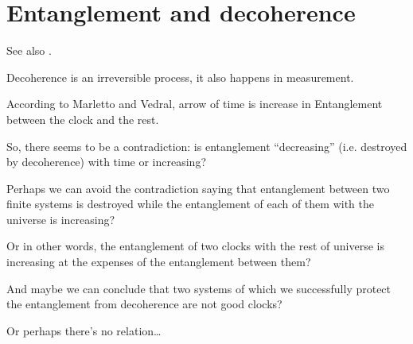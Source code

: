 \section{Entanglement and decoherence}
See also \cite{EntanglementVsDecoherence}.

Decoherence is an irreversible process, it also happens in measurement.

According to Marletto and Vedral, arrow of time is increase in Entanglement
between the clock and the rest.

So, there seems to be a contradiction: is entanglement ``decreasing''
(i.e. destroyed by decoherence) with time
or increasing?

Perhaps we can avoid the contradiction saying that
entanglement between two finite systems is
destroyed while the entanglement of each of them with the universe
is increasing?

Or in other words, the entanglement of two clocks with the rest of universe
is increasing at the expenses of the entanglement between them?

And maybe we can conclude that two systems  of which we successfully
protect the entanglement from decoherence are not good clocks?

Or perhaps there's no relation\dots

\fi
